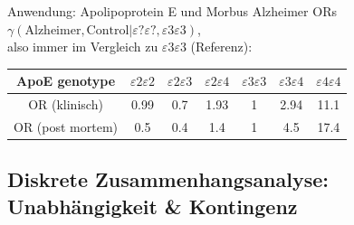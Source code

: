 \documentclass[
  10pt,
  ignorenonframetext,
]{beamer}
\begin{document}
\begin{frame}{Anwendung: Apolipoprotein E und Morbus Alzheimer}
\label{anwendung-apolipoprotein-e-und-morbus-alzheimer-1}
ORs
\(\gamma(\text{Alzheimer}, \text{Control} | \varepsilon{?}\varepsilon{?}, \varepsilon 3\varepsilon 3)\),\\
also immer im Vergleich zu \(\varepsilon3\varepsilon3\) (Referenz):

\vspace{0.5cm}

\begin{tabular}{c|c c c c c c }
  ApoE genotype   & $\varepsilon2\varepsilon2$ & $\varepsilon2\varepsilon3$   & $\varepsilon2\varepsilon4$
  & $\varepsilon3\varepsilon3$  & $\varepsilon3\varepsilon4$ & $\varepsilon4\varepsilon4$ \\\hline 
  OR (klinisch) & 0.99 & 0.7 & 1.93 & 1 & 2.94 & 11.1 \\ 
  OR (post mortem) & 0.5 & 0.4 & 1.4 & 1 & 4.5 & 17.4 \\ 
\end{tabular}
\end{frame}

\subsection{Diskrete Zusammenhangsanalyse: Unabhängigkeit \&
Kontingenz}\label{diskrete-zusammenhangsanalyse-unabhuxe4ngigkeit-kontingenz}
\end{document}

